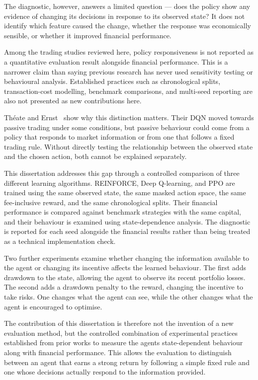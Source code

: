 The diagnostic, however, answers a limited question --- does the policy
show any evidence of changing its decisions in response to its observed
state? It does not identify which feature caused the change, whether the
response was economically sensible, or whether it improved financial
performance.

Among the trading studies reviewed here, policy responsiveness is not
reported as a quantitative evaluation result alongside financial
performance. This is a narrower claim than saying previous research has
never used sensitivity testing or behavioural analysis. Established
practices such as chronological splits, transaction-cost modelling,
benchmark comparisons, and multi-seed reporting are also not presented
as new contributions here.

Théate and Ernst~\cite{theate2021} show why this distinction matters. Their DQN
moved towards passive trading under some conditions, but passive
behaviour could come from a policy that responds to market information
or from one that follows a fixed trading rule. Without directly testing
the relationship between the observed state and the chosen action, both
cannot be explained separately.

This dissertation addresses this gap through a controlled comparison of
three different learning algorithms. REINFORCE, Deep Q-learning, and PPO
are trained using the same observed state, the same masked action space,
the same fee-inclusive reward, and the same chronological splits. Their
financial performance is compared against benchmark strategies with the
same capital, and their behaviour is examined using state-dependence
analysis. The diagnostic is reported for each seed alongside the
financial results rather than being treated as a technical
implementation check.

Two further experiments examine whether changing the information
available to the agent or changing its incentive affects the learned
behaviour. The first adds drawdown to the state, allowing the agent to
observe its recent portfolio losses. The second adds a drawdown penalty
to the reward, changing the incentive to take risks. One changes what
the agent can see, while the other changes what the agent is encouraged
to optimise.

The contribution of this dissertation is therefore not the invention of
a new evaluation method, but the controlled combination of experimental
practices established from prior works to measure the
agent\textquotesingle s state-dependent behaviour along with financial
performance. This allows the evaluation to distinguish between an agent
that earns a strong return by following a simple fixed rule and one
whose decisions actually respond to the information provided.


